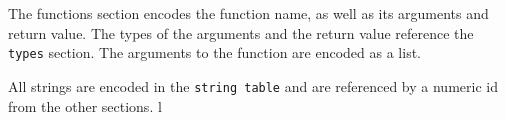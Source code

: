 The functions section encodes the function name, as well as its arguments
and return value.  The types of the arguments and the return value
reference the \verb|types| section.  The arguments to the function
are encoded as a list.

All strings are encoded in the \verb|string table| and are referenced by
a numeric id from the other sections.
l
